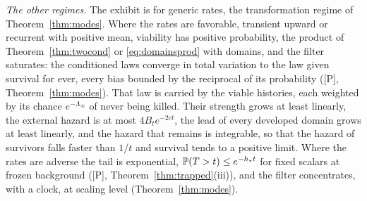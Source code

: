 \emph{The other regimes.} The exhibit is for generic rates, the
transformation regime of Theorem~\ref{thm:modes}. Where the rates are favorable,
transient upward or recurrent with positive mean, viability has positive
probability, the product of Theorem~\ref{thm:twocond} or \eqref{eq:domainsprod} with domains, and
the filter saturates: the conditioned laws converge in total variation to
the law given survival for ever, every bias bounded by the reciprocal of its
probability ([P], Theorem~\ref{thm:modes}). That law is carried by the viable histories, each weighted by its chance $e^{-\Lambda_\infty}$ of never being killed.
Their strength grows at least linearly, the external hazard is at most
$4B_te^{-2ct}$, the lead of every developed domain grows at least
linearly, and the hazard that remains is integrable, so that the hazard
of survivors falls faster than $1/t$ and survival tends to a positive
limit. Where the rates are adverse the tail is exponential,
$\mathbb{P}(T>t)\le e^{-h_\ast t}$ for fixed scalars at frozen background ([P],
Theorem~\ref{thm:trapped}(iii)), and the filter concentrates, with a clock, at scaling level
(Theorem~\ref{thm:modes}).

